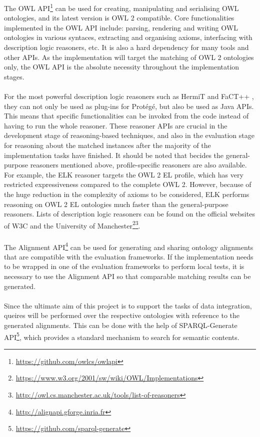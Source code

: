 The OWL API\footnote{\url{https://github.com/owlcs/owlapi}} can be used for creating, manipulating and serialising OWL ontologies, and its latest version is OWL 2 compatible. Core functionalities implemented in the OWL API include: parsing, rendering and writing OWL ontologies in various syntaces, extracting and organising axioms, interfacing with description logic reasoners, etc. It is also a hard dependency for many tools and other APIs. As the implementation will target the matching of OWL 2 ontologies only, the OWL API is the absolute necessity throughout the implementation stages.
\\\\
For the most powerful description logic reasoners such as HermiT \cite{DBLP:journals/jar/GlimmHMSW14} and FaCT++ \cite{DBLP:conf/cade/TsarkovH06}, they can not only be used as plug-ins for Protégé, but also be used as Java APIs. This means that specific functionalities can be invoked from the code instead of having to run the whole reasoner. These reasoner APIs are crucial in the development stage of reasoning-based techniques, and also in the evaluation stage for reasoning about the matched instances after the majority of the implementation tasks have finished. It should be noted that becides the general-purpose reasoners mentioned above, profile-specific reasoners are also available. For example, the ELK \cite{DBLP:journals/jar/KazakovKS14} reasoner targets the OWL 2 EL profile, which has very restricted expressiveness compared to the complete OWL 2. However, because of the huge reduction in the complexity of axioms to be considered, ELK performs reasoning on OWL 2 EL ontologies much faster than the general-purpose reasoners. Lists of description logic reasoners can be found on the official websites of W3C and the University of Manchester\footnote{\url{https://www.w3.org/2001/sw/wiki/OWL/Implementations}}\footnote{\url{http://owl.cs.manchester.ac.uk/tools/list-of-reasoners}}.
\\\\
The Alignment API\footnote{\url{http://alignapi.gforge.inria.fr}} can be used for generating and sharing ontology alignments that are compatible with the evaluation frameworks. If the implementation needs to be wrapped in one of the evaluation frameworks to perform local tests, it is necessary to use the Alignment API so that comparable matching results can be generated.
\\\\
Since the ultimate aim of this project is to support the tasks of data integration, queires will be performed over the respective ontologies with reference to the generated alignments. This can be done with the help of SPARQL-Generate API\footnote{\url{https://github.com/sparql-generate}}, which provides a standard mechanism to search for semantic contents.

